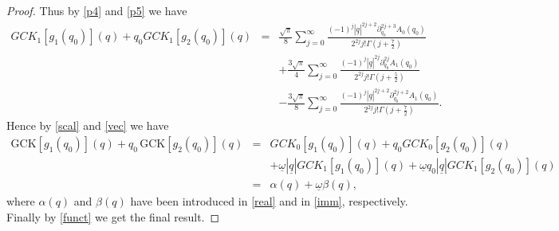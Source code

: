 \documentclass[10pt,a4paper]{amsart}
\begin{document}
\begin{proof}
Thus by \eqref{p4} and \eqref{p5} we have
\begin{eqnarray}
\nonumber
GCK_1[g_1(q_0)](q)+q_0 GCK_1[g_2(q_0)](q)&=&\frac{\sqrt{\pi}}{8} \sum_{j=0}^\infty \frac{(-1)^j | \underline{q}|^{2j+2} \partial_{q_0}^{2j+3}A_0(q_0)}{2^{2j} j! \Gamma \left(j+\frac{7}{2}\right)}\\
\nonumber
&&+ \frac{3 \sqrt{\pi}}{4} \sum_{j=0}^\infty \frac{(-1)^j | \underline{q}|^{2j} \partial_{q_0}^{2j}A_1(q_0)}{2^{2j}j! \Gamma \left(j+\frac{5}{2}\right)}\\
\label{vec}
&&-\frac{3\sqrt{\pi}}{8} \sum_{j=0}^\infty \frac{(-1)^j | \underline{q}|^{2j+2} \partial_{q_0}^{2j+2}A_1(q_0)}{2^{2j}j! \Gamma \left(j+\frac{7}{2}\right)}.
\end{eqnarray}
Hence by \eqref{scal} and \eqref{vec} we have
\begin{eqnarray*}
\mathrm{GCK}[g_1(q_0)](q) + q_0\, \mathrm{GCK}[g_2(q_0)](q)&=&GCK_0[g_1(q_0)](q)+q_0GCK_0[g_2(q_0)](q)\\
&&+ \underline{\omega} | \underline{q}| GCK_1[g_1(q_0)](q)+ \underline{\omega}q_0|\underline{q}| GCK_1[g_2(q_0)](q)\\
&=& \alpha(q)+ \underline{\omega} \beta(q),
\end{eqnarray*}
where $\alpha(q)$ and $\beta(q)$ have been introduced in \eqref{real} and in \eqref{imm}, respectively. Finally by \eqref{funct} we get the final result.


\end{proof}
\end{document}
